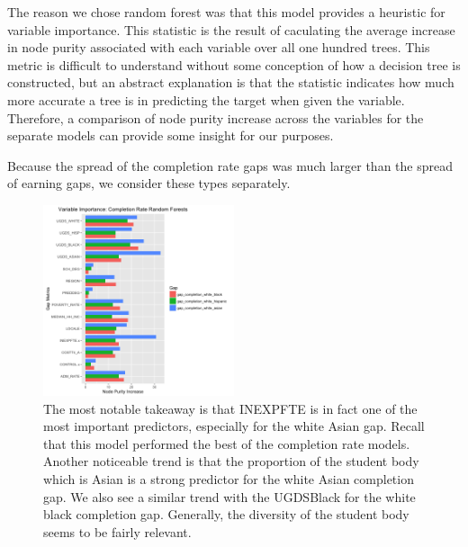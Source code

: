 \documentclass{article}
\begin{document}
The reason we chose random forest was that this model provides a heuristic for variable importance. This statistic is the result of caculating the average increase in node purity associated with each variable over all one hundred trees. This metric is difficult to understand without some conception of how a decision tree is constructed, but an abstract explanation is that the statistic indicates how much more accurate a tree is in predicting the target when given the variable. Therefore, a comparison of node purity increase across the variables for the separate models can provide some insight for our purposes.

Because the spread of the completion rate gaps was much larger than the spread of earning gaps, we consider these types separately.


\begin{figure}[H]
\centering
\includegraphics[width=0.5\textwidth]{../images/rf_importance_completion.png}
\caption{\label{fig: RFCompletionRates} The most notable takeaway is that INEXPFTE is in fact one of the most important predictors, especially for the white Asian gap. Recall that this model performed the best of the completion rate models. Another noticeable trend is that the proportion of the student body which is Asian is a strong predictor for the white Asian completion gap. We also see a similar trend with the UGDSBlack for the white black completion gap. Generally, the diversity of the student body seems to be fairly relevant.}
\end{figure}
\end{document}
